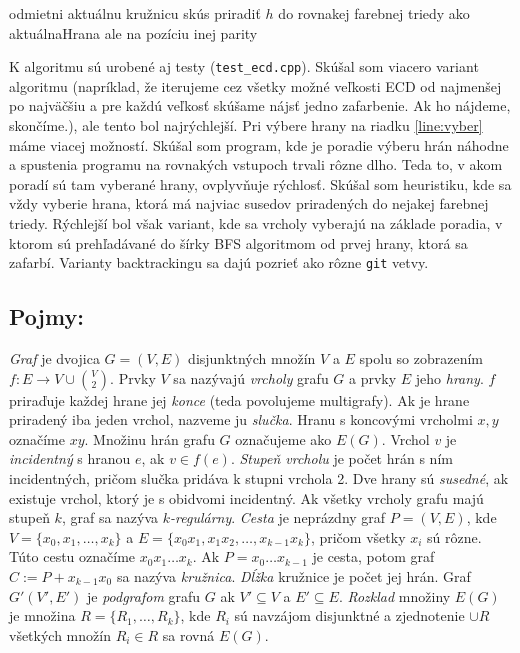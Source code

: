 \documentclass[11pt]{article}
\begin{document}
\begin{algorithmic}[1]
        \State odmietni aktuálnu kružnicu
        \State \Return
        \State {} 
        \State \Return
        \Else
            \State skús priradiť $h$ do rovnakej farebnej triedy ako aktuálnaHrana ale na pozíciu inej parity
        \EndFor
        \EndIf
        
    \EndFunction
\end{algorithmic}

K algoritmu sú urobené aj testy (\texttt{test\_ecd.cpp}). Skúšal som viacero variant algoritmu (napríklad, že 
iterujeme cez všetky možné veľkosti ECD od najmenšej po najväčšiu a pre každú veľkosť skúšame nájsť jedno zafarbenie.
Ak ho nájdeme, skončíme.), ale tento bol najrýchlejší. Pri výbere hrany na riadku \ref{line:vyber}
máme viacej možností. Skúšal som program, kde je poradie výberu hrán náhodne a spustenia
programu na rovnakých vstupoch trvali rôzne dlho. Teda to, v akom poradí sú tam vyberané 
hrany, ovplyvňuje rýchlosť. Skúšal som heuristiku, kde sa vždy vyberie hrana, ktorá má najviac
susedov priradených do nejakej farebnej triedy. Rýchlejší bol však variant, kde sa vrcholy vyberajú
na základe poradia, v ktorom sú prehľadávané do šírky BFS algoritmom od prvej hrany, ktorá sa zafarbí.
Varianty backtrackingu sa dajú pozrieť ako rôzne \texttt{git} vetvy. 


\subsection*{Pojmy:}
\textit{Graf} je dvojica $G = (V,E)$ disjunktných množín $V$ a $E$ spolu so zobrazením
$f:E \to V \cup \binom{V}{2} $. Prvky $V$ sa nazývajú \textit{vrcholy} grafu $G$ a prvky $E$ jeho \textit{hrany}.
$f$ priraďuje každej hrane jej \textit{konce} (teda povolujeme multigrafy). Ak je hrane priradený iba jeden vrchol, nazveme ju \textit{slučka}.
Hranu s koncovými vrcholmi $x,y$ označíme $xy$. Množinu hrán grafu $G$ označujeme ako $E(G)$. Vrchol 
$v$ je \textit{incidentný} s hranou $e$, ak $v\in f(e)$. \textit{Stupeň vrcholu} je počet
hrán s ním incidentných, pričom slučka pridáva k stupni vrchola 2. Dve hrany sú \textit{susedné}, ak existuje vrchol, ktorý je 
s obidvomi incidentný. Ak všetky vrcholy grafu
majú stupeň $k$, graf sa nazýva \textit{$k$-regulárny}. \textit{Cesta} je neprázdny graf $P = (V,E)$,
kde $V = \{x_0, x_1, \ldots, x_k\}$ a $E = \{x_0x_1, x_1x_2, \ldots, x_{k-1}x_k\}$,
pričom všetky $x_i$ sú rôzne. Túto cestu označíme $x_0x_1\ldots x_k$. Ak $P = x_0\ldots x_{k-1}$ je cesta, potom
graf $C := P + x_{k-1}x_0$ sa nazýva \textit{kružnica}. \textit{Dĺžka} kružnice je počet jej hrán. Graf
$ G'(V',E')$ je \textit{podgrafom} grafu $G$ ak $V' \subseteq V$ a $E' \subseteq E$.
\textit{Rozklad} množiny $E(G)$ je množina $R = \{R_1, \ldots, R_k\}$, kde $R_i$
sú navzájom disjunktné a zjednotenie $\cup R$ všetkých množín $R_i \in R$ sa rovná $E(G)$. \cite{diestel2024graph}
\end{document}
